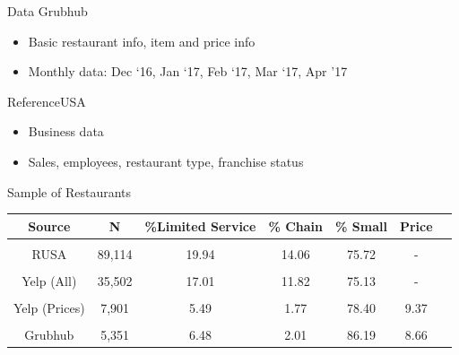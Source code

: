 \documentclass[xcolor=table]{beamer}
\begin{document}
\begin{spacing}{1.2}
\begin{frame}{Data}
Grubhub
\begin{itemize}
\item Basic restaurant info, item and price info
\item Monthly data: Dec `16, Jan `17, Feb `17, Mar `17, Apr '17
\end{itemize}

ReferenceUSA
\begin{itemize}
\item Business data
\item Sales, employees, restaurant type, franchise status
\end{itemize}

\end{frame}


%



\begin{frame}{Sample of Restaurants}

\centering
\footnotesize
\begin{tabular}{ccccccc } \\ \hline \hline
Source & N & \%Limited Service  & \% Chain   & \% Small & Price \\ \hline \hline
&&& \\
RUSA & 89,114 & 19.94 & 14.06 & 75.72 & -\\
\\
Yelp (All) & 35,502 & 17.01 & 11.82 & 75.13& - \\
\\
Yelp (Prices) & 7,901 & 5.49  & 1.77 & 78.40 & 9.37 \\
\\ 
Grubhub  & 5,351 & 6.48 & 2.01 &  86.19 & 8.66 \\
\end{tabular}
\end{frame}


\end{spacing}
\end{document}
